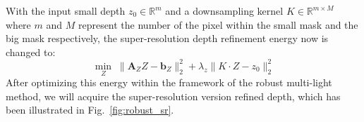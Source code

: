 With the input small depth $z_0\in\mathbb{R}^m$ and a downsampling kernel $K \in \mathbb{R}^{m\times M}$ where $m$ and $M$ represent the number of the pixel within the small mask and the big mask respectively, the super-resolution depth refinement energy now is changed to:
 \begin{equation}\label{eq:robust_depth_estimate_d}
    \min_{Z} \; \lVert  \mathbf{A}_{Z}Z - \mathbf{b}_Z\rVert^2_2 + \lambda_{z}\lVert K\cdot Z - z_0 \rVert_2^2
\end{equation}
 After optimizing this energy within the framework of the robust multi-light method, we will acquire the super-resolution version refined depth, which has been illustrated in Fig.~\ref{fig:robust_sr}.
  \begin{figure}[!ht]
\centering
{}

\end{figure}
